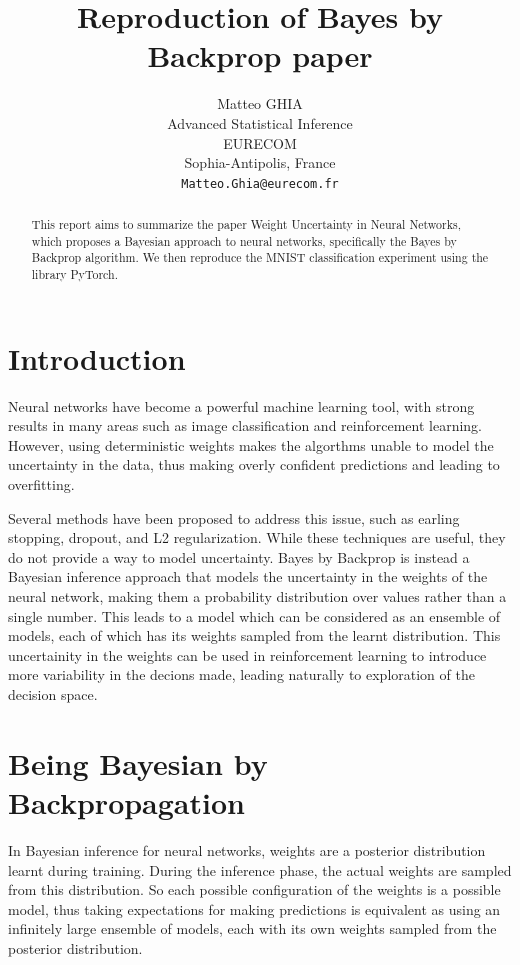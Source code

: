\documentclass{article}
\title{Reproduction of Bayes by Backprop paper}
\author{
    Matteo GHIA \\
    Advanced Statistical Inference\\
    EURECOM\\
    Sophia-Antipolis, France \\
    \texttt{Matteo.Ghia@eurecom.fr}
}
\begin{document}
\maketitle


\begin{abstract}
    This report aims to summarize the paper Weight Uncertainty in Neural Networks, which proposes a Bayesian approach to neural networks, specifically the Bayes by Backprop algorithm. We then reproduce the MNIST classification experiment using the library PyTorch.
\end{abstract}


\section{Introduction}

Neural networks have become a powerful machine learning tool, with strong results in many areas such as image classification and reinforcement learning. However, using deterministic weights makes the algorthms unable to model the uncertainty in the data, thus making overly confident predictions and leading to overfitting.

Several methods have been proposed to address this issue, such as earling stopping, dropout, and L2 regularization. While these techniques are useful, they do not provide a way to model uncertainty. Bayes by Backprop is instead a Bayesian inference approach that models the uncertainty in the weights of the neural network, making them a probability distribution over values rather than a single number. This leads to a model which can be considered as an ensemble of models, each of which has its weights sampled from the learnt distribution. This uncertainity in the weights can be used in reinforcement learning to introduce more variability in the decions made, leading naturally to exploration of the decision space.

\section{Being Bayesian by Backpropagation}

In Bayesian inference for neural networks, weights are a posterior distribution learnt during training. During the inference phase, the actual weights are sampled from this distribution. So each possible configuration of the weights is a possible model, thus taking expectations for making predictions is equivalent as using an infinitely large ensemble of models, each with its own weights sampled from the posterior distribution.
\end{document}
